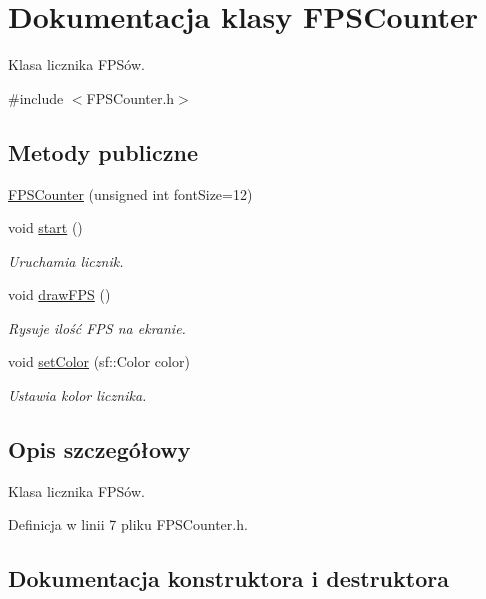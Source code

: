 \hypertarget{class_f_p_s_counter}{}\section{Dokumentacja klasy F\+P\+S\+Counter}
\label{class_f_p_s_counter}


Klasa licznika F\+PS\textquotesingle{}ów.  




{\ttfamily \#include $<$F\+P\+S\+Counter.\+h$>$}

\subsection*{Metody publiczne}
\begin{DoxyCompactItemize}
\item 
\mbox{\hyperlink{class_f_p_s_counter_ae565c465bd222c4f733813b402d232a8}{F\+P\+S\+Counter}} (unsigned int font\+Size=12)
\item 
void \mbox{\hyperlink{class_f_p_s_counter_abba94df2064bfa561ef9d1a3e11929a5}{start}} ()
\begin{DoxyCompactList}\small\item\em Uruchamia licznik. \end{DoxyCompactList}\item 
void \mbox{\hyperlink{class_f_p_s_counter_a7415ae4bb4094b4809627caf5e40d8f1}{draw\+F\+PS}} ()
\begin{DoxyCompactList}\small\item\em Rysuje ilość F\+PS na ekranie. \end{DoxyCompactList}\item 
void \mbox{\hyperlink{class_f_p_s_counter_a57be5e95f140cb230f3f4e11ca476857}{set\+Color}} (sf\+::\+Color color)
\begin{DoxyCompactList}\small\item\em Ustawia kolor licznika. \end{DoxyCompactList}\end{DoxyCompactItemize}


\subsection{Opis szczegółowy}
Klasa licznika F\+PS\textquotesingle{}ów. 

Definicja w linii 7 pliku F\+P\+S\+Counter.\+h.



\subsection{Dokumentacja konstruktora i destruktora}
\mbox{\label{class_f_p_s_counter_ae565c465bd222c4f733813b402d232a8}} 
